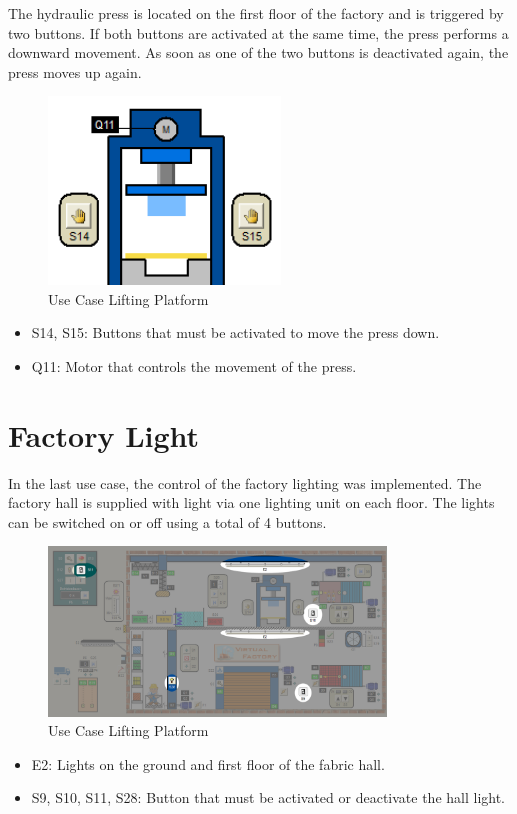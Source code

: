 The hydraulic press is located on the first floor of the factory and is triggered by two buttons. If both buttons are activated at the same time, the press performs a downward movement. As soon as one of the two buttons is deactivated again, the press moves up again.

\begin{figure}[h]
    \centering
    \includegraphics[width=0.55\textwidth]{images/usecase_hydraulic_press.png}
    \caption{Use Case Lifting Platform}
    \label{fig:UseCaseHydraulicPress}
\end{figure}

\begin{itemize}
    \item S14, S15: Buttons that must be activated to move the press down.    
    \item Q11: Motor that controls the movement of the press.
\end{itemize}

\section{Factory Light}

In the last use case, the control of the factory lighting was implemented. The factory hall is supplied with light via one lighting unit on each floor. The lights can be switched on or off using a total of 4 buttons.

\begin{figure}[h]
    \centering
    \includegraphics[width=0.80\textwidth]{images/usecase_factory_light.png}
    \caption{Use Case Lifting Platform}
    \label{fig:UseCaseFactoryLight}
\end{figure}

\begin{itemize}
    \item E2: Lights on the ground and first floor of the fabric hall.
    \item S9, S10, S11, S28: Button that must be activated or deactivate the hall light.
\end{itemize}

